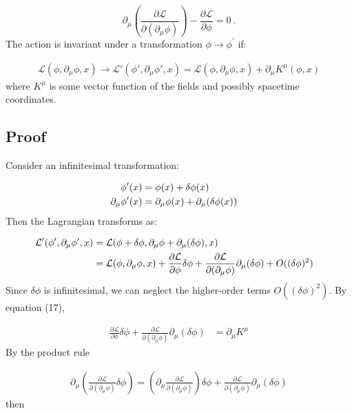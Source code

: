 \documentclass{article}
\begin{document}
\begin{equation}
\partial_\mu \left( \frac{\partial \mathcal{L}}{\partial (\partial_\mu \phi)}\right) - \frac{\partial \mathcal{L}}{\partial \phi} = 0\ .
\end{equation}
The action is invariant under a transformation $\phi \to \phi^\prime$ if:

\begin{align}
\mathcal{L}(\phi, \partial_\mu \phi, x) \to \mathcal{L}'(\phi', \partial_\mu \phi', x) = \mathcal{L}(\phi, \partial_\mu \phi, x) + \partial_\mu K^\mu(\phi, x)
\end{align}
where $K^\mu$ is some vector function of the fields and possibly spacetime coordinates.

\subsection{Proof}
Consider an infinitesimal transformation:

\begin{align}
\phi'(x) &= \phi(x) + \delta \phi(x) \cr
\partial_\mu \phi'(x) &= \partial_\mu \phi(x) + \partial_\mu (\delta \phi(x))
\end{align}
Then the Lagrangian transforms as:

\begin{align*}
\mathcal{L}'(\phi', \partial_\mu \phi', x) &= \mathcal{L}(\phi + \delta \phi, \partial_\mu \phi + \partial_\mu (\delta \phi), x) \cr
&= \mathcal{L}(\phi, \partial_\mu \phi, x) + \frac{\partial \mathcal{L}}{\partial \phi} \delta \phi + \frac{\partial \mathcal{L}}{\partial (\partial_\mu \phi)} \partial_\mu (\delta \phi) + O((\delta \phi)^2)
\end{align*}
Since $\delta \phi$ is infinitesimal, we can neglect the higher-order terms $O((\delta \phi)^2)$.
By equation (17),

\begin{align*}
\frac{\partial \mathcal{L}}{\partial \phi} \delta \phi + \frac{\partial \mathcal{L}}{\partial (\partial_\mu \phi)} \partial_\mu (\delta \phi) &= \partial_\mu K^\mu
\end{align*}
By the product rule

\begin{align*}
\partial_\mu \left( \frac{\partial \mathcal{L}}{\partial (\partial_\mu \phi)} \delta \phi \right) = \left( \partial_\mu \frac{\partial \mathcal{L}}{\partial (\partial_\mu \phi)} \right) \delta \phi + \frac{\partial \mathcal{L}}{\partial (\partial_\mu \phi)} \partial_\mu (\delta \phi)
\end{align*}
then
\end{document}
